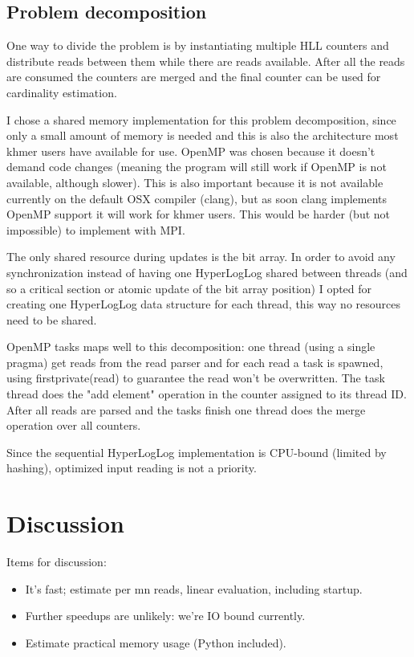 \documentclass{bioinfo}
\begin{document}
\subsection{Problem decomposition}

One way to divide the problem is by instantiating multiple HLL counters
and distribute reads between them while there are reads available.
After all the reads are consumed the counters are merged and the final
counter can be used for cardinality estimation.

I chose a shared memory implementation for this problem decomposition,
since only a small amount of memory is needed and this is also the architecture
most khmer users have available for use.
OpenMP was chosen because it doesn't demand code changes
(meaning the program will still work if OpenMP is not available,
although slower).
This is also important because it is not available currently on the default OSX compiler (clang),
but as soon clang implements OpenMP support it will work for khmer users.
This would be harder (but not impossible) to implement with MPI.

The only shared resource during updates is the bit array.
In order to avoid any synchronization instead of having one HyperLogLog shared between threads
(and so a critical section or atomic update of the bit array position)
I opted for creating one HyperLogLog data structure for each thread,
this way no resources need to be shared.

OpenMP tasks maps well to this decomposition:
one thread (using a single pragma) get reads from the read parser
and for each read a task is spawned,
using firstprivate(read) to guarantee the read won't be overwritten.
The task thread does the "add element" operation in the counter assigned to its thread ID.
After all reads are parsed and the tasks finish one thread does the merge operation
over all counters.

Since the sequential HyperLogLog implementation is CPU-bound (limited by hashing),
optimized input reading is not a priority.

\section{Discussion}

Items for discussion:

\begin{itemize}
\item It's fast; estimate per mn reads, linear evaluation, including startup.
\item Further speedups are unlikely: we're IO bound currently.
\item Estimate practical memory usage (Python included).
\end{itemize}
\end{document}
